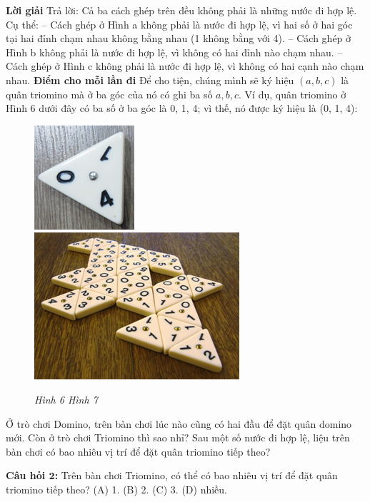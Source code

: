 	{\bf Lời giải}   %
	\vskip 0.1cm
	Trả lời: Cả ba cách ghép trên đều không phải là những nước đi hợp lệ. Cụ thể:
	\vskip 0.1cm
	-- Cách ghép ở Hình a không phải là nước đi hợp lệ, vì hai số ở hai góc tại hai đỉnh chạm nhau không bằng nhau (1 không bằng với 4).
	\vskip 0.1cm
	-- Cách ghép ở Hình b không phải là nước đi hợp lệ, vì không có hai đỉnh nào chạm nhau.
	\vskip 0.1cm
	-- Cách ghép ở Hình c không phải là nước đi hợp lệ, vì không có hai cạnh nào chạm nhau.
	\vskip 0.1cm
	{\bf {Điểm cho mỗi lần đi}}   %
	\vskip 0.1cm
	Để cho tiện, chúng mình sẽ ký hiệu $(a, b, c)$ là quân triomino mà ở ba góc của nó có ghi ba số $a, b, c$. Ví dụ, quân triomino ở Hình 6 dưới đây có ba số ở ba góc là 0, 1, 4; vì thế, nó được ký hiệu là (0, 1, 4):
	\begin{multicols}{2}
		\begin{figure}[H]
			\centering
			\vspace*{5pt}
			\captionsetup{labelformat=empty, justification=centering}
			\includegraphics[height=0.19\textwidth]{h4a}
			\includegraphics[height=0.19\textwidth]{h5a}
			\caption{\textit{\small Hình 6 \hspace{50pt}Hình 7}}
			\vspace*{-5pt}
		\end{figure}
		\vspace*{-5pt}
		Ở trò chơi Domino, trên bàn chơi lúc nào cũng có hai đầu để đặt quân domino mới. Còn ở trò chơi Triomino thì sao nhỉ? Sau một số nước đi hợp lệ, liệu trên bàn chơi có bao nhiêu vị trí để đặt quân triomino tiếp theo?
	\end{multicols}
	\vskip 0.1cm
	\textbf{Câu hỏi $\pmb{2}$:}
	\vskip 0.1cm
	Trên bàn chơi Triomino, có thể có bao nhiêu vị trí để đặt quân triomino tiếp theo?
	\vskip 0.1cm
	\hspace*{00pt}(A)  1. \hspace*{50pt}(B)  2.
	\hspace*{50pt}(C)  3. \hspace*{50pt}(D)  nhiều.\\
